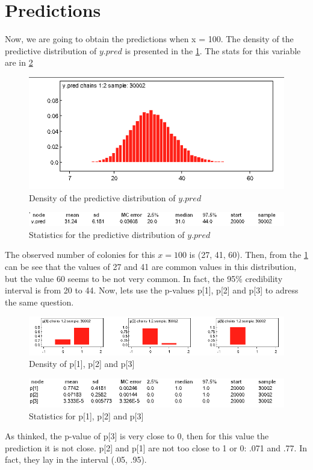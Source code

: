 \documentclass{article}
\begin{document}
\newpage
\section{Predictions}

Now, we are going to obtain the predictions when x = 100. The density of the predictive distribution of $y.pred$ is presented in the \cref{fig:fig9}. The stats for this variable are in \cref{fig:fig11}

  \begin{figure}[ht!]
  \centering
  \includegraphics[width=.7\textwidth]{Figures/9.png}
  \caption{Density of the predictive distribution of $y.pred$}
  \label{fig:fig9}
  \end{figure}  
  
  \begin{figure}[ht!]
  \centering
  \includegraphics[width=.7\textwidth]{Figures/11.png}
  \caption{Statistics for the predictive distribution of $y.pred$}
  \label{fig:fig11}
  \end{figure}  


The observed number of colonies for this $x = 100$ is (27, 41, 60). Then, from the \cref{fig:fig9} can be see that the values of 27 and 41 are common values in this distribution, but the value 60 seems to be not very common. In fact, the 95\% credibility interval is from 20 to 44. Now, lets use the p-values p[1], p[2] and p[3] to adress the same question.


  \begin{figure}[ht!]
  \centering
  \includegraphics[width=.7\textwidth]{Figures/10.png}
  \caption{Density of p[1], p[2] and p[3]}
  \label{fig:fig10}
  \end{figure}  

  \begin{figure}[ht!]
  \centering
  \includegraphics[width=.7\textwidth]{Figures/12.png}
  \caption{Statistics for p[1], p[2] and p[3]}
  \label{fig:fig12}
  \end{figure}  
As thinked, the p-value of p[3] is very close to 0, then for this value the prediction it is not close. p[2] and p[1] are not too close to 1 or 0: .071 and .77. In fact, they lay in the interval (.05, .95).
\end{document}
